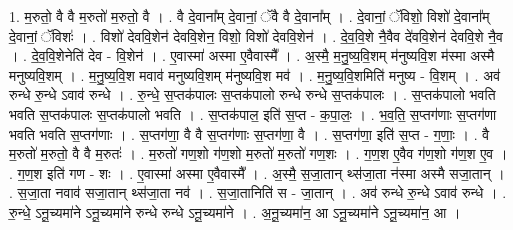 \documentclass[17pt]{extarticle}
\begin{document}
1. म॒रुतो॒ वै वै म॒रुतो॑ म॒रुतो॒ वै । . वै दे॒वाना᳚म् दे॒वानां॒ ॅवै वै दे॒वाना᳚म् । . दे॒वानां॒ ॅविशो॒ विशो॑ दे॒वाना᳚म् दे॒वानां॒ ॅविशः॑ । . विशो॑ देववि॒शेन॑ देववि॒शेन॒ विशो॒ विशो॑ देववि॒शेन॑ । . दे॒व॒वि॒शे नै॒वैव दे॑ववि॒शेन॑ देववि॒शे नै॒व । . दे॒व॒वि॒शेनेति॑ देव - वि॒शेन॑ । . ए॒वास्मा॑ अस्मा ए॒वैवास्मै᳚ । . अ॒स्मै॒ म॒नु॒ष्य॒वि॒शम् म॑नुष्यवि॒श म॑स्मा अस्मै मनुष्यवि॒शम् । . म॒नु॒ष्य॒वि॒श मवाव॑ मनुष्यवि॒शम् म॑नुष्यवि॒श मव॑ । . म॒नु॒ष्य॒वि॒शमिति॑ मनुष्य - वि॒शम् । . अव॑ रुन्धे रु॒न्धे ऽवाव॑ रुन्धे । . रु॒न्धे॒ स॒प्तक॑पालः स॒प्तक॑पालो रुन्धे रुन्धे स॒प्तक॑पालः । . स॒प्तक॑पालो भवति भवति स॒प्तक॑पालः स॒प्तक॑पालो भवति । . स॒प्तक॑पाल॒ इति॑ स॒प्त - क॒पा॒लः॒ । . भ॒व॒ति॒ स॒प्तग॑णाः स॒प्तग॑णा भवति भवति स॒प्तग॑णाः । . स॒प्तग॑णा॒ वै वै स॒प्तग॑णाः स॒प्तग॑णा॒ वै । . स॒प्तग॑णा॒ इति॑ स॒प्त - ग॒णाः॒ । . वै म॒रुतो॑ म॒रुतो॒ वै वै म॒रुतः॑ । . म॒रुतो॑ गण॒शो ग॑ण॒शो म॒रुतो॑ म॒रुतो॑ गण॒शः । . ग॒ण॒श ए॒वैव ग॑ण॒शो ग॑ण॒श ए॒व । . ग॒ण॒श इति॑ गण - शः । . ए॒वास्मा॑ अस्मा ए॒वैवास्मै᳚ । . अ॒स्मै॒ स॒जा॒तान् थ्स॑जा॒ता न॑स्मा अस्मै सजा॒तान् । . स॒जा॒ता नवाव॑ सजा॒तान् थ्स॑जा॒ता नव॑ । . स॒जा॒तानिति॑ स - जा॒तान् । . अव॑ रुन्धे रु॒न्धे ऽवाव॑ रुन्धे । . रु॒न्धे॒ ऽनू॒च्यमा॑ने ऽनू॒च्यमा॑ने रुन्धे रुन्धे ऽनू॒च्यमा॑ने । . अ॒नू॒च्यमा॑न॒ आ ऽनू॒च्यमा॑ने ऽनू॒च्यमा॑न॒ आ । \newline
\end{document}
